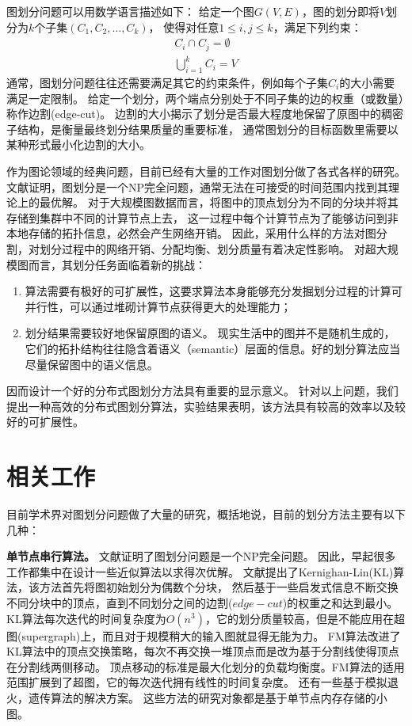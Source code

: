 \documentclass[master]{njuthesis}
\begin{document}
图划分问题可以用数学语言描述如下： 给定一个图$G(V, E)$，图的划分即将$V$划分为$k$个子集$(C_1, C_2, \dots, C_k)$，
使得对任意$1 \leq i,j \leq k$，满足下列约束：
\begin{equation}
\begin{aligned}
\label{eq:4-1}
 C_i \cap C_j=\emptyset \\
 \bigcup\limits_{i=1}^{k} C_{i} = V
 \end{aligned}
\end{equation}
通常，图划分问题往往还需要满足其它的约束条件，例如每个子集$C_i$的大小需要满足一定限制。
给定一个划分，两个端点分别处于不同子集的边的权重（或数量）称作边割(edge-cut)。
边割的大小揭示了划分是否最大程度地保留了原图中的稠密子结构，是衡量最终划分结果质量的重要标准，
通常图划分的目标函数里需要以某种形式最小化边割的大小。

作为图论领域的经典问题，目前已经有大量的工作对图划分做了各式各样的研究。 
文献\cite{garey1974somenp}证明，图划分是一个NP完全问题，通常无法在可接受的时间范围内找到其理论上的最优解。
对于大规模图数据而言，将图中的顶点划分为不同的分块并将其存储到集群中不同的计算节点上去，
这一过程中每个计算节点为了能够访问到非本地存储的拓扑信息，必然会产生网络开销。
因此，采用什么样的方法对图分割，对划分过程中的网络开销、分配均衡、划分质量有着决定性影响。
对超大规模图而言，其划分任务面临着新的挑战：
\begin{enumerate}
\item 算法需要有极好的可扩展性，这要求算法本身能够充分发掘划分过程的计算可并行性，可以通过堆砌计算节点获得更大的处理能力；

\item 划分结果需要较好地保留原图的语义。
现实生活中的图并不是随机生成的，它们的拓扑结构往往隐含着语义（semantic）层面的信息。好的划分算法应当尽量保留图中的语义信息。
\end{enumerate}

因而设计一个好的分布式图划分方法具有重要的显示意义。
针对以上问题，我们提出一种高效的分布式图划分算法，实验结果表明，该方法具有较高的效率以及较好的可扩展性。

\section{相关工作}
目前学术界对图划分问题做了大量的研究，概括地说，目前的划分方法主要有以下几种：

\textbf{单节点串行算法。 } 文献\cite{garey1974somenp}证明了图划分问题是一个NP完全问题。 
因此，早起很多工作都集中在设计一些近似算法以求得次优解。
文献\cite{kernighan1970efficient}提出了Kernighan-Lin(KL)算法，该方法首先将图初始划分为偶数个分块，
然后基于一些启发式信息不断交换不同分块中的顶点，直到不同划分之间的边割($edge-cut$)的权重之和达到最小。
KL算法每次迭代的时间复杂度为$O(n^3)$，它的划分质量较高，但是不能应用在超图(supergraph)上，而且对于规模稍大的输入图就显得无能为力。
FM算法\cite{fiduccia1988linear}改进了KL算法中的顶点交换策略，每次不再交换一堆顶点而是改为基于分割线使得顶点在分割线两侧移动。
顶点移动的标准是最大化划分的负载均衡度。FM算法的适用范围扩展到了超图，它的每次迭代拥有线性的时间复杂度。
还有一些基于模拟退火\cite{johnson1989optimization}，遗传算法\cite{bui1996genetic}的解决方案。
这些方法的研究对象都是基于单节点内存存储的小图。
\end{document}
